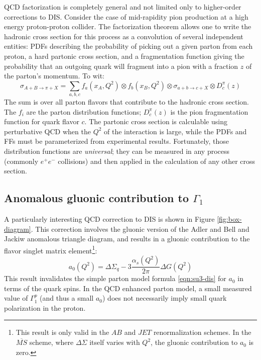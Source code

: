 QCD factorization is completely general and not limited only to higher-order
corrections to DIS. Consider the case of mid-rapidity pion production at a high
energy proton-proton collider. The factorization theorem allows one to write the
hadronic cross section for this process as a convolution of several independent
entities: PDFs describing the probability of picking out a given parton from
each proton, a hard partonic cross section, and a fragmentation function giving
the probability that an outgoing quark will fragment into a pion with a fraction
\(z\) of the parton's momentum. To wit:
%
\begin{equation}
  \sigma_{A+B \rightarrow \pi+X} = \sum_{a,b,c} f_a(x_A, Q^2) \otimes f_b(x_B, Q^2) \otimes \sigma_{a+b \rightarrow c + X} \otimes D_c^{\pi}(z) 
\end{equation}
%
The sum is over all parton flavors that contribute to the hadronic cross
section. The \(f_i\) are the parton distribution functions; \(D_c^{\pi}(z)\) is
the pion fragmentation function for quark flavor \(c\). The partonic cross
section is calculable using perturbative QCD when the \(Q^2\) of the interaction
is large, while the PDFs and FFs must be parameterized from experimental
results. Fortunately, those distribution functions are \textit{universal}; they
can be measured in any process (commonly \(e^+e^-\) collisions) and then applied
in the calculation of any other cross section. %

\subsection{Anomalous gluonic contribution to $\Gamma_1$}

A particularly interesting QCD correction to DIS is shown in Figure
\ref{fig:box-diagram}. This correction involves the gluonic version of the Adler
\cite{Adler:1969gk} and Bell and Jackiw \cite{Bell:1969ts} anomalous triangle
diagram, and results in a gluonic contribution to the flavor singlet matrix
element\footnote{This result is only valid in the \(AB\) and \(JET\)
renormalization schemes. In the \(\overline{MS}\) scheme, where \(\Delta
\Sigma\) itself varies with \(Q^2\), the gluonic contribution to \(a_0\) is
zero.}:
%
\begin{equation}
  a_0(Q^2) = \Delta \Sigma_q - 3\frac{\alpha_s(Q^2)}{2\pi} \Delta G(Q^2)
\end{equation}
%
This result invalidates the simple parton model formula \ref{eqn:su3-dis} for
\(a_0\) in terms of the quark spins. In the QCD enhanced parton model, a small
measured value of \(\Gamma_1^p\) (and thus a small \(a_0\)) does not necessarily
imply small quark polarization in the proton.

